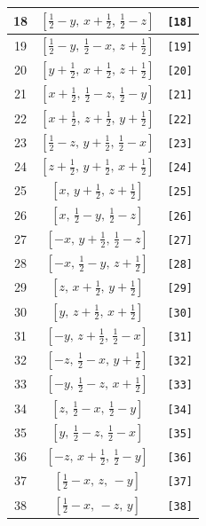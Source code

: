 \documentclass[fleqn,8pt]{jsarticle}
\begin{document}
\begin{longtable}{ccc}
18 & $\left[ \frac{1}{2} - y,\, x + \frac{1}{2},\, \frac{1}{2} - z \right]$ & {\tt [18]} \\ \hline
19 & $\left[ \frac{1}{2} - y,\, \frac{1}{2} - x,\, z + \frac{1}{2} \right]$ & {\tt [19]} \\ \hline
20 & $\left[ y + \frac{1}{2},\, x + \frac{1}{2},\, z + \frac{1}{2} \right]$ & {\tt [20]} \\ \hline
21 & $\left[ x + \frac{1}{2},\, \frac{1}{2} - z,\, \frac{1}{2} - y \right]$ & {\tt [21]} \\ \hline
22 & $\left[ x + \frac{1}{2},\, z + \frac{1}{2},\, y + \frac{1}{2} \right]$ & {\tt [22]} \\ \hline
23 & $\left[ \frac{1}{2} - z,\, y + \frac{1}{2},\, \frac{1}{2} - x \right]$ & {\tt [23]} \\ \hline
24 & $\left[ z + \frac{1}{2},\, y + \frac{1}{2},\, x + \frac{1}{2} \right]$ & {\tt [24]} \\ \hline
25 & $\left[ x,\, y + \frac{1}{2},\, z + \frac{1}{2} \right]$ & {\tt [25]} \\ \hline
26 & $\left[ x,\, \frac{1}{2} - y,\, \frac{1}{2} - z \right]$ & {\tt [26]} \\ \hline
27 & $\left[ - x,\, y + \frac{1}{2},\, \frac{1}{2} - z \right]$ & {\tt [27]} \\ \hline
28 & $\left[ - x,\, \frac{1}{2} - y,\, z + \frac{1}{2} \right]$ & {\tt [28]} \\ \hline
29 & $\left[ z,\, x + \frac{1}{2},\, y + \frac{1}{2} \right]$ & {\tt [29]} \\ \hline
30 & $\left[ y,\, z + \frac{1}{2},\, x + \frac{1}{2} \right]$ & {\tt [30]} \\ \hline
31 & $\left[ - y,\, z + \frac{1}{2},\, \frac{1}{2} - x \right]$ & {\tt [31]} \\ \hline
32 & $\left[ - z,\, \frac{1}{2} - x,\, y + \frac{1}{2} \right]$ & {\tt [32]} \\ \hline
33 & $\left[ - y,\, \frac{1}{2} - z,\, x + \frac{1}{2} \right]$ & {\tt [33]} \\ \hline
34 & $\left[ z,\, \frac{1}{2} - x,\, \frac{1}{2} - y \right]$ & {\tt [34]} \\ \hline
35 & $\left[ y,\, \frac{1}{2} - z,\, \frac{1}{2} - x \right]$ & {\tt [35]} \\ \hline
36 & $\left[ - z,\, x + \frac{1}{2},\, \frac{1}{2} - y \right]$ & {\tt [36]} \\ \hline
37 & $\left[ \frac{1}{2} - x,\, z,\, - y \right]$ & {\tt [37]} \\ \hline
38 & $\left[ \frac{1}{2} - x,\, - z,\, y \right]$ & {\tt [38]} \\ \hline

\end{longtable}
\end{document}
